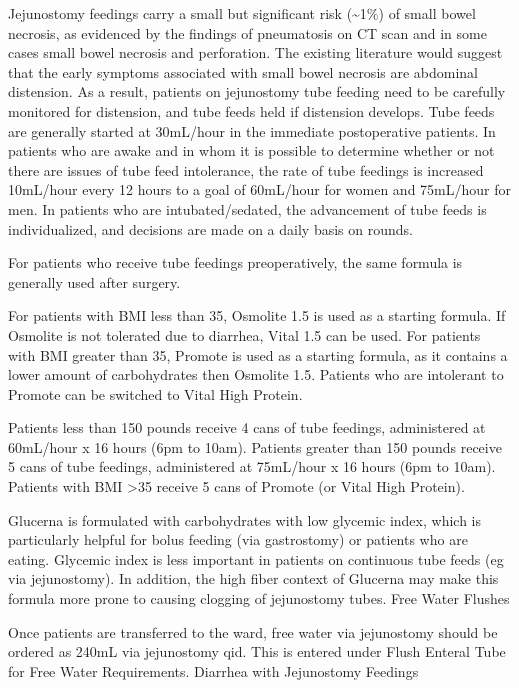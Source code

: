 \documentclass[
]{book}
\begin{document}
Jejunostomy feedings carry a small but significant risk (\textasciitilde1\%) of small bowel necrosis, as evidenced by the findings of pneumatosis on CT scan and in some cases small bowel necrosis and perforation. The existing literature would suggest that the early symptoms associated with small bowel necrosis are abdominal distension. As a result, patients on jejunostomy tube feeding need to be carefully monitored for distension, and tube feeds held if distension develops.\citep{taylor34} Tube feeds are generally started at 30mL/hour in the immediate postoperative patients. In patients who are awake and in whom it is possible to determine whether or not there are issues of tube feed intolerance, the rate of tube feedings is increased 10mL/hour every 12 hours to a goal of 60mL/hour for women and 75mL/hour for men. In patients who are intubated/sedated, the advancement of tube feeds is individualized, and decisions are made on a daily basis on rounds.

For patients who receive tube feedings preoperatively, the same formula is generally used after surgery.

For patients with BMI less than 35, Osmolite 1.5 is used as a starting formula. If Osmolite is not tolerated due to diarrhea, Vital 1.5 can be used. For patients with BMI greater than 35, Promote is used as a starting formula, as it contains a lower amount of carbohydrates then Osmolite 1.5. Patients who are intolerant to Promote can be switched to Vital High Protein.

Patients less than 150 pounds receive 4 cans of tube feedings, administered at 60mL/hour x 16 hours (6pm to 10am). Patients greater than 150 pounds receive 5 cans of tube feedings, administered at 75mL/hour x 16 hours (6pm to 10am). Patients with BMI \textgreater35 receive 5 cans of Promote (or Vital High Protein).

Glucerna is formulated with carbohydrates with low glycemic index, which is particularly helpful for bolus feeding (via gastrostomy) or patients who are eating. Glycemic index is less important in patients on continuous tube feeds (eg via jejunostomy). In addition, the high fiber context of Glucerna may make this formula more prone to causing clogging of jejunostomy tubes.
Free Water Flushes

Once patients are transferred to the ward, free water via jejunostomy should be ordered as 240mL via jejunostomy qid. This is entered under Flush Enteral Tube for Free Water Requirements.
Diarrhea with Jejunostomy Feedings
\end{document}
